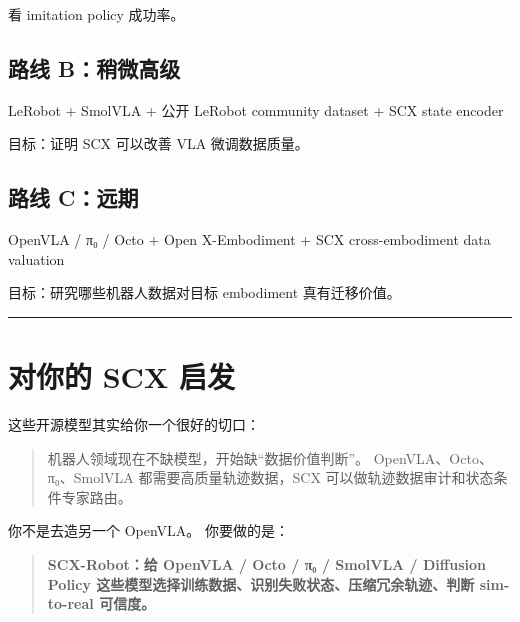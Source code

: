 \documentclass[
  12pt,
]{ctexart}
\newenvironment{Shaded}{}{}
\newcommand{\NormalTok}[1]{#1}
\begin{document}
看 imitation policy 成功率。

\subsection{路线
B：稍微高级}\label{ux8defux7ebf-bux7a0dux5faeux9ad8ux7ea7}

\begin{Shaded}
\begin{Highlighting}[]
\NormalTok{LeRobot}
\NormalTok{+ SmolVLA}
\NormalTok{+ 公开 LeRobot community dataset}
\NormalTok{+ SCX state encoder}
\end{Highlighting}
\end{Shaded}

目标：证明 SCX 可以改善 VLA 微调数据质量。

\subsection{路线 C：远期}\label{ux8defux7ebf-cux8fdcux671f}

\begin{Shaded}
\begin{Highlighting}[]
\NormalTok{OpenVLA / π₀ / Octo}
\NormalTok{+ Open X{-}Embodiment}
\NormalTok{+ SCX cross{-}embodiment data valuation}
\end{Highlighting}
\end{Shaded}

目标：研究哪些机器人数据对目标 embodiment 真有迁移价值。

\begin{center}\rule{0.5\linewidth}{0.5pt}\end{center}

\section{对你的 SCX 启发}\label{ux5bf9ux4f60ux7684-scx-ux542fux53d1}

这些开源模型其实给你一个很好的切口：

\begin{quote}
机器人领域现在不缺模型，开始缺``数据价值判断''。
OpenVLA、Octo、π₀、SmolVLA 都需要高质量轨迹数据，SCX
可以做轨迹数据审计和状态条件专家路由。
\end{quote}

你不是去造另一个 OpenVLA。 你要做的是：

\begin{quote}
\textbf{SCX-Robot：给 OpenVLA / Octo / π₀ / SmolVLA / Diffusion Policy
这些模型选择训练数据、识别失败状态、压缩冗余轨迹、判断 sim-to-real
可信度。}
\end{quote}
\end{document}
